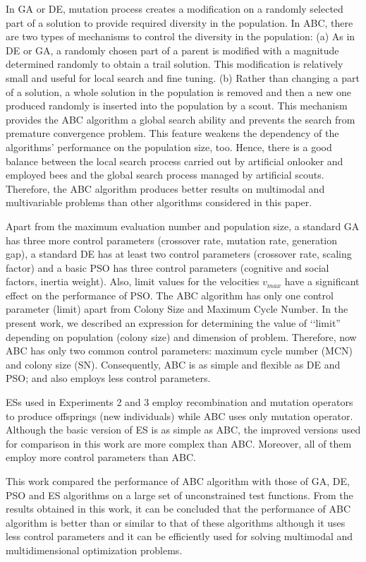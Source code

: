 \documentclass[pdftex,11pt]{article}
\begin{document}
In GA or DE, mutation process creates a modification on a randomly selected part of a solution to provide required diversity in the population. In ABC, there are two types of mechanisms to control the diversity in the population: (a) As in DE or GA, a randomly chosen part of a parent is modified with a magnitude determined randomly to obtain a trail solution. This modification is relatively small and useful for local search and fine tuning. (b) Rather than changing a part of a solution, a whole solution in the population is removed and then a new one produced randomly is inserted into the population by a scout. This mechanism provides the ABC algorithm a global search ability and prevents the search from premature convergence problem. This feature weakens the dependency of the algorithms’ performance on the population size, too. Hence, there is a good balance between the local search process carried out by artificial onlooker and employed bees and the global search process managed by artificial scouts. Therefore, the ABC algorithm produces better results on multimodal and multivariable problems than other algorithms considered in this paper.

Apart from the maximum evaluation number and population size, a standard GA has three more control parameters (crossover rate, mutation rate, generation gap), a standard DE has at least two control parameters (crossover rate, scaling factor) and a basic PSO has three control parameters (cognitive and social factors, inertia weight). Also, limit values for the velocities $v_{max}$ have a significant effect on the performance of PSO. The ABC algorithm has only one control parameter (limit) apart from Colony Size and Maximum Cycle Number. In the present work, we described an expression for determining the value of ‘‘limit” depending on population (colony size) and dimension of problem. Therefore, now ABC has only two common control parameters: maximum cycle number (MCN) and colony size (SN). Consequently, ABC is as simple and flexible as DE and PSO; and also employs less control parameters.

ESs used in Experiments 2 and 3 employ recombination and mutation operators to produce offsprings (new individuals) while ABC uses only mutation operator. Although the basic version of ES is as simple as ABC, the improved versions used for comparison in this work are more complex than ABC. Moreover, all of them employ more control parameters than ABC.

This work compared the performance of ABC algorithm with those of GA, DE, PSO and ES algorithms on a large set of unconstrained test functions. From the results obtained in this work, it can be concluded that the performance of ABC algorithm is better than or similar to that of these algorithms although it uses less control parameters and it can be efficiently used for solving multimodal and multidimensional optimization problems.
\end{document}

